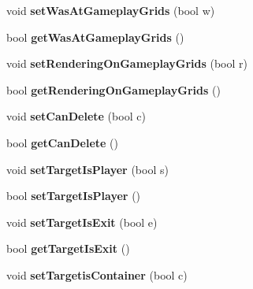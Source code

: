 \begin{DoxyCompactItemize}
\item 
\hypertarget{class_map_editor_engine_ad61d7e49684b5d84c2a1b5f5debad1aa}{}\label{class_map_editor_engine_ad61d7e49684b5d84c2a1b5f5debad1aa} 
void {\bfseries set\+Was\+At\+Gameplay\+Grids} (bool w)
\item 
\hypertarget{class_map_editor_engine_ae0c34f0fa8ace7e4197803ef075ae399}{}\label{class_map_editor_engine_ae0c34f0fa8ace7e4197803ef075ae399} 
bool {\bfseries get\+Was\+At\+Gameplay\+Grids} ()
\item 
\hypertarget{class_map_editor_engine_a1304336cbfdeee844001f555a939f9b7}{}\label{class_map_editor_engine_a1304336cbfdeee844001f555a939f9b7} 
void {\bfseries set\+Rendering\+On\+Gameplay\+Grids} (bool r)
\item 
\hypertarget{class_map_editor_engine_ad9d14ddbb80040140c2a71e44846f5b8}{}\label{class_map_editor_engine_ad9d14ddbb80040140c2a71e44846f5b8} 
bool {\bfseries get\+Rendering\+On\+Gameplay\+Grids} ()
\item 
\hypertarget{class_map_editor_engine_a032858f5d1f171e70f0fcaf14ba4e1dd}{}\label{class_map_editor_engine_a032858f5d1f171e70f0fcaf14ba4e1dd} 
void {\bfseries set\+Can\+Delete} (bool c)
\item 
\hypertarget{class_map_editor_engine_ad804c9eeaa1942a0547b47d826dd97e8}{}\label{class_map_editor_engine_ad804c9eeaa1942a0547b47d826dd97e8} 
bool {\bfseries get\+Can\+Delete} ()
\item 
\hypertarget{class_map_editor_engine_ac75f75de727594141a5eb4dcdc4a4217}{}\label{class_map_editor_engine_ac75f75de727594141a5eb4dcdc4a4217} 
void {\bfseries set\+Target\+Is\+Player} (bool s)
\item 
\hypertarget{class_map_editor_engine_a22f5de2105cde0909405f4e95f3c3f1d}{}\label{class_map_editor_engine_a22f5de2105cde0909405f4e95f3c3f1d} 
bool {\bfseries set\+Target\+Is\+Player} ()
\item 
\hypertarget{class_map_editor_engine_a8717004b05f61e2ae7e6d2ec22658313}{}\label{class_map_editor_engine_a8717004b05f61e2ae7e6d2ec22658313} 
void {\bfseries set\+Target\+Is\+Exit} (bool e)
\item 
\hypertarget{class_map_editor_engine_ab722b015bd93f4aaa0204e9bebcd476b}{}\label{class_map_editor_engine_ab722b015bd93f4aaa0204e9bebcd476b} 
bool {\bfseries get\+Target\+Is\+Exit} ()
\item 
\hypertarget{class_map_editor_engine_aed27c11ba5f02ab59a61a9313dab50fb}{}\label{class_map_editor_engine_aed27c11ba5f02ab59a61a9313dab50fb} 
void {\bfseries set\+Targetis\+Container} (bool c)
\item 

\end{DoxyCompactItemize}
